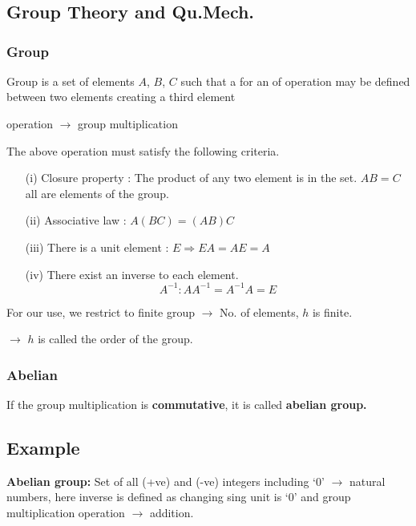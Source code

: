 \chapter[Lecture 4]{}\label{lec4}

\section*{Group Theory and Qu.Mech.}

\subsection*{Group}

Group is a set of elements $A$, $B$, $C$ such that a for an of operation may be defined between two elements creating a third element
\begin{center}
operation $\to$ group multiplication
\end{center}
The above operation must satisfy the following criteria.
\begin{itemize}
\item[(i)] Closure property : The product of any two element is in the set. $AB=C$ all are elements of the group.

\item[(ii)] Associative law : $A(BC)=(AB)C$

\item[(iii)] There is a unit element : $E\Rightarrow EA=AE=A$

\item[(iv)] There exist an inverse to each element.
$$
A^{-1}:AA^{-1}=A^{-1}A=E
$$
\end{itemize}
For our use, we restrict to finite group $\to$ No. of elements, $h$ is finite.

$\to$ $h$ is called the order of the group.

\subsection*{Abelian}

If the group multiplication is {\bf commutative}, it is called {\bf abelian group.}

\section*{Example}

\noindent
{\bf Abelian group:} Set of all (+ve) and (-ve) integers including `0' $\to$ natural numbers, here inverse is defined as changing sing unit is `0' and group multiplication operation $\to$ addition.

